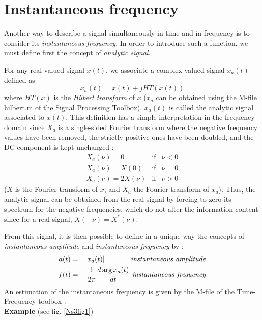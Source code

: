 \section{Instantaneous frequency}
\label{anasig}
  Another way to describe a signal simultaneously in time and in frequency
is to consider its {\it instantaneous frequency}. In order to introduce such a
function, we must define first the concept of {\it analytic signal}.

  For any real valued signal $x(t)$, we associate a complex valued signal
$x_a(t)$ defined as
\[x_a(t) = x(t) + j HT(x(t))\]
where $HT(x)$ is the {\it Hilbert transform} of $x$ ($x_a$ can be obtained
using the M-file {\ttfamily hilbert.m} of the Signal Processing
Toolbox). $x_a(t)$ is called the analytic signal associated to $x(t)$. This
definition has a simple interpretation in the frequency domain since $X_a$
is a single-sided Fourier transform where the negative frequency values
have been removed, the strictly positive ones have been doubled, and the DC
component is kept unchanged :
\begin{eqnarray*}
	X_a(\nu) = 0 \ \ \ \ \ \ &\mbox{if}& \nu < 0 \\
	X_a(\nu) = X(0)\ \ &\mbox{if}& \nu = 0 \\
	X_a(\nu) = 2X(\nu) &\mbox{if}& \nu > 0 
\end{eqnarray*}
($X$ is the Fourier transform of $x$, and $X_a$ the Fourier transform of
$x_a$). Thus, the analytic signal can be obtained from the real signal by
forcing to zero its spectrum for the negative frequencies, which do not
alter the information content since for a real signal, $X(-\nu)=X^*(\nu)$.

 From this signal, it is then possible to define in a unique way the
concepts of {\it instantaneous amplitude} and {\it instantaneous frequency} by :
\begin{eqnarray*}
a(t) &=& |x_a(t)| \ \ \ \ \ \ \ \ \ \ \ \mbox{\it  instantaneous amplitude} \\
f(t) &=& \frac{1}{2\pi} \frac{d\arg{x_a(t)}}{dt}\ \mbox{\it  instantaneous
frequency}  
\end{eqnarray*}
An estimation of the instantaneous frequency is given by the M-file
 of the Time-Frequency
toolbox :\\

   {\bf Example} (see fig. \ref{Ns3fig1})


